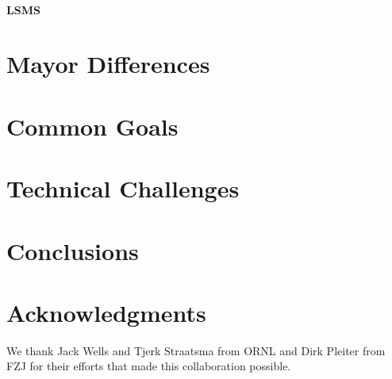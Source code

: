 \documentclass{llncs}
\begin{document}
\paragraph{LSMS} \label{section:lsms}


\section{Mayor Differences} \label{section:differ}

\section{Common Goals} \label{section:common}

\section{Technical Challenges} \label{section:tech}

\section{Conclusions}\label{section:summary}

\section*{Acknowledgments}
We thank Jack Wells and Tjerk Straatsma from ORNL and Dirk Pleiter from FZJ 
for their efforts that made this collaboration possible.

\end{document}
